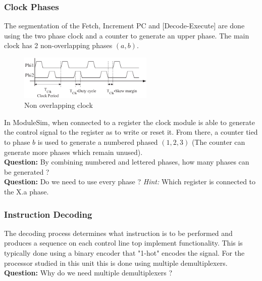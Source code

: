 \documentclass[a4paper, 11pt]{article}
\begin{document}
\subsubsection{Clock Phases}
The segmentation of the Fetch, Increment PC and [Decode-Execute] are done using the two phase clock and a counter to generate an upper phase.
The main clock has 2 non-overlapping phases $(a,b)$. 
\begin{figure}[H]
    \centering
    \includegraphics[width =0.57\textwidth]{Images/The-non-overlapping-two-phase-clocking-scheme.png}
    \caption{Non overlapping clock}
    \label{fig:nonoverclk}
    \end{figure}
In ModuleSim, when connected to a register the clock module is able to generate the control signal to the register as to write or reset it. From there, a counter tied to phase $b$ is used to generate a numbered phased $(1,2,3)$ (The counter can generate more phases which  remain unused). \\
\textbf{Question:} By combining numbered and lettered phases, how many phases can be generated ? \\
\textbf{Question:} Do we need to use every phase ? \textit{Hint:} Which register is connected to the X.a phase.

\subsubsection{Instruction Decoding}
The decoding process determines what instruction is to be performed and produces a sequence on each control line top implement functionality. This is typically done using a binary encoder that "1-hot" encodes the signal. For the processor studied in this unit this is done using multiple demultiplexers. \\
\textbf{Question:} Why do we need multiple demultiplexers ? 




\end{document}

